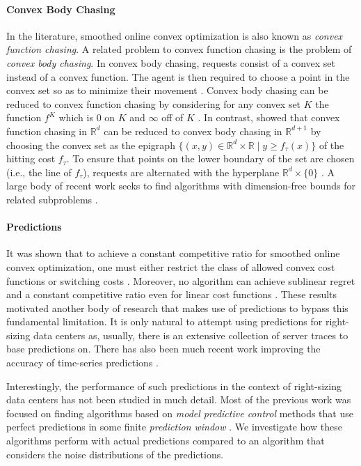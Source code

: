 \paragraph{Convex Body Chasing} In the literature, smoothed online convex optimization is also known as \emph{convex function chasing}. A related problem to convex function chasing is the problem of \emph{convex body chasing}. In convex body chasing, requests consist of a convex set instead of a convex function. The agent is then required to choose a point in the convex set so as to minimize their movement \cite{Antoniadis2016}. Convex body chasing can be reduced to convex function chasing by considering for any convex set $K$ the function $f^K$ which is 0 on $K$ and $\infty$ off of $K$ \cite{Sellke2019}. In contrast,  \citeauthor*{Sellke2019} showed that convex function chasing in $\mathbb{R}^d$ can be reduced to convex body chasing in $\mathbb{R}^{d+1}$ by choosing the convex set as the epigraph $\{(x,y) \in \mathbb{R}^d \times \mathbb{R} \mid y \geq f_{\tau}(x)\}$ of the hitting cost $f_{\tau}$. To ensure that points on the lower boundary of the set are chosen (i.e., the line of $f_{\tau}$), requests are alternated with the hyperplane $\mathbb{R}^d \times \{0\}$ \cite{Sellke2019}. A large body of recent work seeks to find algorithms with dimension-free bounds for related subproblems \cite{Bubeck2018, Bubeck2018_2, Argue2019, Argue2020}.

\paragraph{Predictions} It was shown that to achieve a constant competitive ratio for smoothed online convex optimization, one must either restrict the class of allowed convex cost functions or switching costs \cite{Chen2018}. Moreover, no algorithm can achieve sublinear regret and a constant competitive ratio even for linear cost functions \cite{Andrew2015}. These results motivated another body of research that makes use of predictions to bypass this fundamental limitation. It is only natural to attempt using predictions for right-sizing data centers as, usually, there is an extensive collection of server traces to base predictions on. There has also been much recent work improving the accuracy of time-series predictions \cite{Taylor2017, Benidis2020, Chen2020, Hosseini2021}.

Interestingly, the performance of such predictions in the context of right-sizing data centers has not been studied in much detail. Most of the previous work was focused on finding algorithms based on \emph{model predictive control} methods that use perfect predictions in some finite \emph{prediction window} \cite{Lin2012, Chen2015, Badiei2015, Chen2016, Li2018, Lin2019}. We investigate how these algorithms perform with actual predictions compared to an algorithm that considers the noise distributions of the predictions.

